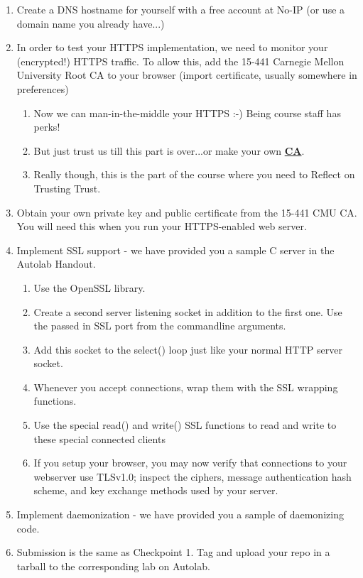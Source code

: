 \begin{enumerate}
\item Create a DNS hostname for yourself with a free account at No-IP \cite{WWW:no-ip} (or use a domain name you already have...)
\item In order to test your HTTPS implementation, we need to monitor your (encrypted!) HTTPS traffic.  To allow this, add the 15-441 Carnegie Mellon University Root CA to your browser (import certificate, usually somewhere in preferences)
\begin{enumerate}
    \item Now we can man-in-the-middle your HTTPS :-) Being course staff has perks!
    \item But just trust us till this part is over...or make your own \textbf{\href{http://www.g-loaded.eu/2005/11/10/be-your-own-ca/}{CA}}.
    \item Really though, this is the part of the course where you need to Reflect on Trusting Trust.
\end{enumerate}
\item Obtain your own private key and public certificate from the 15-441 CMU CA.  You will need this when you run your HTTPS-enabled web server.
\item Implement SSL support - we have provided you a sample C server in the Autolab Handout. 
\begin{enumerate}
    \item Use the OpenSSL library. \cite{www:openssl}
    \item Create a second server listening socket in addition to the first one. Use the passed in SSL port from the commandline arguments.
    \item Add this socket to the select() loop just like your normal HTTP server socket.
    \item Whenever you accept connections, wrap them with the SSL wrapping functions.
    \item Use the special read() and write() SSL functions to read and write to these special connected clients
    \item If you setup your browser, you may now verify that connections to your webserver use TLSv1.0; inspect the ciphers, message authentication hash scheme, and key exchange methods used by your server.
\end{enumerate}
\item Implement daemonization - we have provided you a sample of daemonizing code.
\item Submission is the same as Checkpoint 1. Tag and upload your repo in a tarball to the corresponding lab on Autolab.
\end{enumerate}

